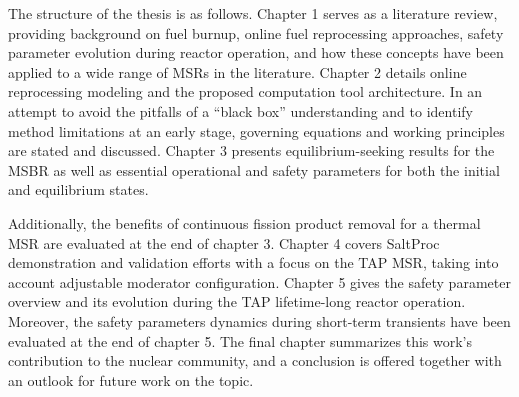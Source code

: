 The structure of the thesis is as follows. Chapter 1 serves as a literature 
review, providing background on fuel burnup, online fuel reprocessing  
approaches, safety parameter evolution during reactor operation, and how these 
concepts have been applied to a wide range of \glspl{MSR} in the literature. 
Chapter 2 details online reprocessing modeling and the proposed computation 
tool architecture. In an attempt to avoid the pitfalls of a ``black box''  
understanding and to identify method limitations at an early stage, governing 
equations and working principles are stated and discussed. Chapter 3 presents 
equilibrium-seeking results for the \gls{MSBR} as well as essential 
operational and safety parameters for both the initial and equilibrium states.

Additionally, the benefits of continuous fission product removal for a thermal 
\gls{MSR} are evaluated at the end of chapter 3. Chapter 4 covers SaltProc 
demonstration and validation efforts with a focus on the \gls{TAP} \gls{MSR},  
taking into account adjustable moderator configuration. Chapter 5 gives the 
safety parameter overview and its evolution during the \gls{TAP} 
lifetime-long reactor operation. Moreover, the safety parameters dynamics 
during short-term transients have been evaluated at the end of chapter 5. The 
final chapter summarizes this work's contribution to the nuclear community, 
and a conclusion is offered together with an outlook for future work on the 
topic.